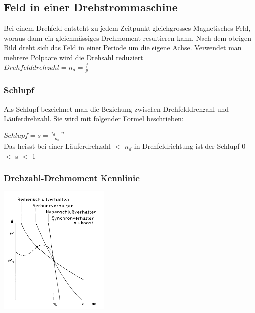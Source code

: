     \subsection{Feld in einer Drehstrommaschine}
        \begin{minipage}{7cm}
        \end{minipage}
        \begin{minipage}{11cm}
            Bei einem Drehfeld entsteht zu jedem Zeitpunkt gleichgrosses Magnetisches Feld, woraus dann ein gleichmässiges Drehmoment resultieren kann. Nach dem obrigen Bild dreht sich das Feld in einer Periode um die eigene Achse. Verwendet man mehrere Polpaare wird die Drehzahl reduziert \\
            $Drehfelddrehzahl  = n_d =\frac{f}{p}$ \\
        \end{minipage}

    \subsubsection{Schlupf}
        Als Schlupf bezeichnet man die Beziehung zwischen Drehfelddrehzahl und Läuferdrehzahl. Sie wird mit folgender Formel beschrieben: \\
        \begin{multicols}{2}
            $Schlupf = s = \frac{n_d - n}{n_d}$ \\
            Das heisst bei einer Läuferdrehzahl $<$ $n_d$ in Drehfeldrichtung ist der Schlupf 0 $<$ s $<$ 1
        \columnbreak
        
        \end{multicols}
        
	\subsubsection{Drehzahl-Drehmoment Kennlinie}
		\begin{center}
			\includegraphics[width=0.4\textwidth]{images/Mn-Kennlinien.png}
		\end{center}        

